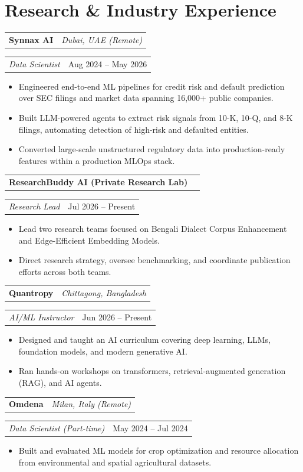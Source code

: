 \documentclass[10pt]{article}
\makeatletter
\newcommand{\entry}[2]{%
  \noindent\begin{tabularx}{\linewidth}{@{}X r@{}}
    \textbf{#1} & \textit{\small #2}
  \end{tabularx}\vspace{-1pt}
}
\newcommand{\subentry}[2]{%
  \noindent\begin{tabularx}{\linewidth}{@{}X r@{}}
    \textit{\small #1} & {\small #2}
  \end{tabularx}\vspace{1pt}
}
\makeatother
\begin{document}
\section{Research \& Industry Experience}
\entry{Synnax AI}{Dubai, UAE (Remote)}
\subentry{Data Scientist}{Aug 2024 -- May 2026}
\begin{itemize}
  \item Engineered end-to-end ML pipelines for credit risk and default prediction over SEC filings and market data spanning 16{,}000+ public companies.
  \item Built LLM-powered agents to extract risk signals from 10-K, 10-Q, and 8-K filings, automating detection of high-risk and defaulted entities.
  \item Converted large-scale unstructured regulatory data into production-ready features within a production MLOps stack.
\end{itemize}
\vspace{4pt}

\entry{ResearchBuddy AI (Private Research Lab)}{}
\subentry{Research Lead}{Jul 2026 -- Present}
\begin{itemize}
  \item Lead two research teams focused on Bengali Dialect Corpus Enhancement and Edge-Efficient Embedding Models.
  \item Direct research strategy, oversee benchmarking, and coordinate publication efforts across both teams.
\end{itemize}
\vspace{4pt}

\entry{Quantropy}{Chittagong, Bangladesh}
\subentry{AI/ML Instructor}{Jun 2026 -- Present}
\begin{itemize}
  \item Designed and taught an AI curriculum covering deep learning, LLMs, foundation models, and modern generative AI.
  \item Ran hands-on workshops on transformers, retrieval-augmented generation (RAG), and AI agents.
\end{itemize}
\vspace{4pt}

\entry{Omdena}{Milan, Italy (Remote)}
\subentry{Data Scientist (Part-time)}{May 2024 -- Jul 2024}
\begin{itemize}
  \item Built and evaluated ML models for crop optimization and resource allocation from environmental and spatial agricultural datasets.
\end{itemize}
\vspace{4pt}
\end{document}
